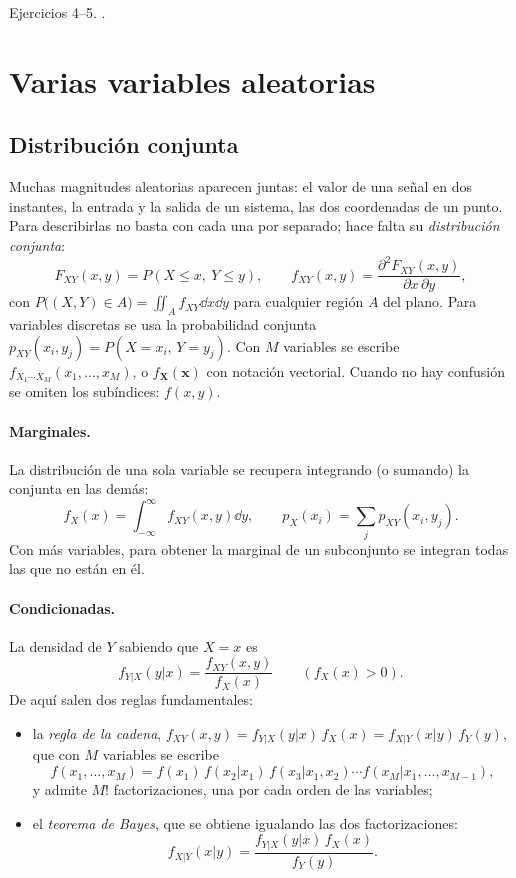 \documentclass[11pt,a4paper]{scrartcl}
\begin{document}
\begin{flushright}\small\color{pdsgris}Ejercicios 4–5. .\end{flushright}

\section{Varias variables aleatorias}\label{sec:varias}

\subsection{Distribución conjunta}

Muchas magnitudes aleatorias aparecen juntas: el valor de una señal en dos instantes, la entrada y la salida de un sistema, las dos coordenadas de un punto. Para describirlas no basta con cada una por separado; hace falta su \emph{distribución conjunta}:
\[
  F_{XY}(x,y)=P(X\le x,\ Y\le y),\qquad f_{XY}(x,y)=\frac{\partial^2F_{XY}(x,y)}{\partial x\,\partial y},
\]
con $P\big((X,Y)\in A\big)=\iint_Af_{XY}\dd x\dd y$ para cualquier región $A$ del plano. Para variables discretas se usa la probabilidad conjunta $p_{XY}(x_i,y_j)=P(X=x_i,\,Y=y_j)$. Con $M$ variables se escribe $f_{X_1\cdots X_M}(x_1,\dots,x_M)$, o $f_{\mathbf X}(\mathbf x)$ con notación vectorial. Cuando no hay confusión se omiten los subíndices: $f(x,y)$.

\paragraph{Marginales.} La distribución de una sola variable se recupera integrando (o sumando) la conjunta en las demás:
\[
  f_X(x)=\int_{-\infty}^{\infty}f_{XY}(x,y)\dd y,\qquad p_X(x_i)=\sum_jp_{XY}(x_i,y_j).
\]
Con más variables, para obtener la marginal de un subconjunto se integran todas las que no están en él.

\paragraph{Condicionadas.} La densidad de $Y$ sabiendo que $X=x$ es
\[
  f_{Y|X}(y|x)=\frac{f_{XY}(x,y)}{f_X(x)}\qquad(f_X(x)>0).
\]
De aquí salen dos reglas fundamentales:
\begin{itemize}
  \item la \emph{regla de la cadena}, $f_{XY}(x,y)=f_{Y|X}(y|x)\,f_X(x)=f_{X|Y}(x|y)\,f_Y(y)$, que con $M$ variables se escribe
  \[
    f(x_1,\dots,x_M)=f(x_1)\,f(x_2|x_1)\,f(x_3|x_1,x_2)\cdots f(x_M|x_1,\dots,x_{M-1}),
  \]
  y admite $M!$ factorizaciones, una por cada orden de las variables;
  \item el \emph{teorema de Bayes}, que se obtiene igualando las dos factorizaciones:
  \[
    f_{X|Y}(x|y)=\frac{f_{Y|X}(y|x)\,f_X(x)}{f_Y(y)} .
  \]
\end{itemize}
\end{document}
